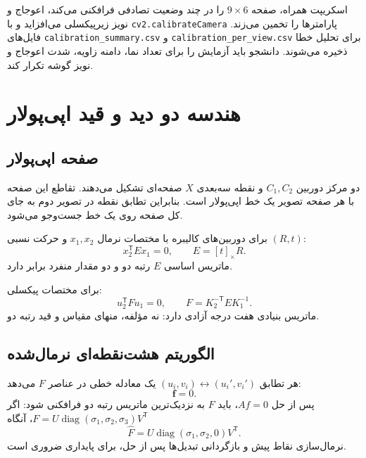 \documentclass[12pt,openany,oneside]{book}
\newcommand{\trans}{^{\mathsf T}}
\newcommand{\vect}[1]{\bm{#1}}
\newcommand{\diag}{\operatorname{diag}}
\newcommand{\skewm}[1]{\left[#1\right]_{\times}}
\begin{document}
\begin{workshopbox}
اسکریپت همراه، صفحه \(9\times6\) را در چند وضعیت تصادفی فرافکنی می‌کند، اعوجاج و نویز زیرپیکسلی می‌افزاید و با
\texttt{cv2.calibrateCamera} پارامترها را تخمین می‌زند. فایل‌های
\texttt{calibration\_summary.csv} و \texttt{calibration\_per\_view.csv}
برای تحلیل خطا ذخیره می‌شوند. دانشجو باید آزمایش را برای تعداد نما، دامنه زاویه، شدت اعوجاج و نویز گوشه تکرار کند.
\end{workshopbox}

\section{هندسه دو دید و قید اپی‌پولار}

\subsection{صفحه اپی‌پولار}
دو مرکز دوربین \(C_1,C_2\) و نقطه سه‌بعدی \(X\) صفحه‌ای تشکیل می‌دهند. تقاطع این صفحه با هر صفحه تصویر یک خط
اپی‌پولار است. بنابراین تطابق نقطه در تصویر دوم به جای کل صفحه روی یک خط جست‌وجو می‌شود.

برای دوربین‌های کالیبره با مختصات نرمال \(x_1,x_2\) و حرکت نسبی \((R,t)\):
\begin{equation}
x_2\trans E x_1=0,
\qquad
E=\skewm{t}R.
\label{eq:essential}
\end{equation}
ماتریس اساسی \(E\) رتبه دو و دو مقدار منفرد برابر دارد.

برای مختصات پیکسلی:
\begin{equation}
u_2\trans F u_1=0,
\qquad
F=K_2^{-\mathsf T}EK_1^{-1}.
\label{eq:fundamental}
\end{equation}
ماتریس بنیادی هفت درجه آزادی دارد: نه مؤلفه، منهای مقیاس و قید رتبه دو.

\subsection{الگوریتم هشت‌نقطه‌ای نرمال‌شده}
هر تطابق \((u_i,v_i)\leftrightarrow(u_i',v_i')\) یک معادله خطی در عناصر \(F\) می‌دهد:
\begin{equation}
[u_i'u_i,\ u_i'v_i,\ u_i',\ v_i'u_i,\ v_i'v_i,\ v_i',\ u_i,\ v_i,\ 1]\vect f=0.
\end{equation}
پس از حل \(Af=0\)، باید \(F\) به نزدیک‌ترین ماتریس رتبه دو فرافکنی شود: اگر
\(F=U\diag(\sigma_1,\sigma_2,\sigma_3)V\trans\)، آنگاه
\begin{equation}
\widehat F=U\diag(\sigma_1,\sigma_2,0)V\trans.
\end{equation}
نرمال‌سازی نقاط پیش و بازگردانی تبدیل‌ها پس از حل، برای پایداری ضروری است.
\end{document}
